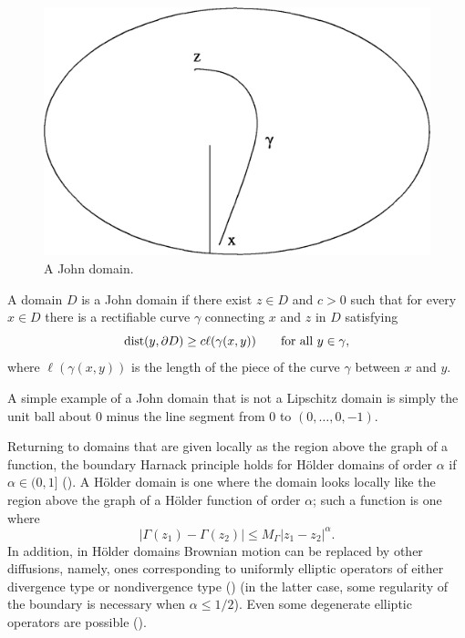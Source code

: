 \bigskip
\begin{figure}[ht]
    \centering\includegraphics{Images/Img7.png}
    \bigskip
    \caption{A John domain.}
    \label{fig:ch3_1.3}
\end{figure}

\begin{definition}\label{def:ch3_1.11}
A domain $D$ is a John domain if there exist $z \in D$ and $c > 0$ such that for every $x \in D$ there is a rectifiable curve $\gamma$ connecting $x$ and $z$ in $D$ satisfying
\begin{equation}\label{eq:ch3_1.31}
    \operatorname{dist}(y,\partial D) \geq c\ell(\gamma(x,y)) \qquad \text{for all}~y \in \gamma,
\end{equation}
where $\ell(\gamma(x,y))$ is the length of the piece of the curve $\gamma$ between $x$ and $y$.
\end{definition}

A simple example of a John domain that is not a Lipschitz domain is simply the unit ball about $0$ minus the line segment from $0$ to $(0,\ldots,0,-1)$.


Returning to domains that are given locally as the region above the graph of a function, the boundary Harnack principle holds for H\"older domains of order $\alpha$ if $\alpha \in (0,1]$ (\cite{BanuelosBassyBurdzy1991}). A H\"older domain is one where the domain looks locally like the region above the graph of a H\"older function of order $\alpha$; such a function is one where
\begin{equation}\label{eq:ch3_1.32}
    |\Gamma(z_1) - \Gamma(z_2)| \leq M_\Gamma|z_1 - z_2|^\alpha.
\end{equation}
In addition, in H\"older domains Brownian motion can be replaced by other diffusions, namely, ones corresponding to uniformly elliptic operators of either divergence type or nondivergence type (\cite{BassBurdzy1991,BassBurdzy1994a}) (in the latter case, some regularity of the boundary is necessary when $\alpha \leq 1/2$). Even some degenerate elliptic operators are possible (\cite{Gao1993a}).

